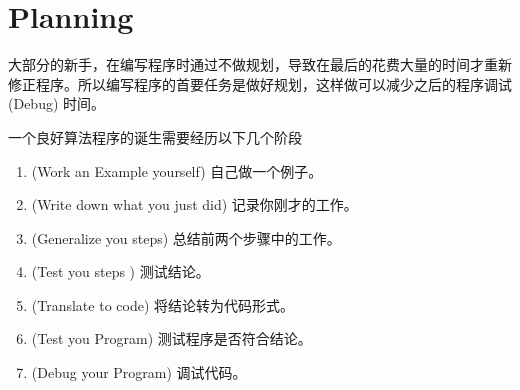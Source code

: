\section{Planning}
大部分的新手，在编写程序时通过不做规划，导致在最后的花费大量的时间才重新修正程序。所以编写程序的首要任务是做好规划，这样做可以减少之后的程序调试 (Debug) 时间。

一个良好算法程序的诞生需要经历以下几个阶段
\begin{enumerate}
	\item (Work an Example yourself) 自己做一个例子。
	\item (Write down what you just did) 记录你刚才的工作。
	\item (Generalize you steps) 总结前两个步骤中的工作。
	\item (Test you steps ) 测试结论。
	\item (Translate to code) 将结论转为代码形式。
	\item (Test you Program) 测试程序是否符合结论。
	\item (Debug your Program) 调试代码。

\end{enumerate}


